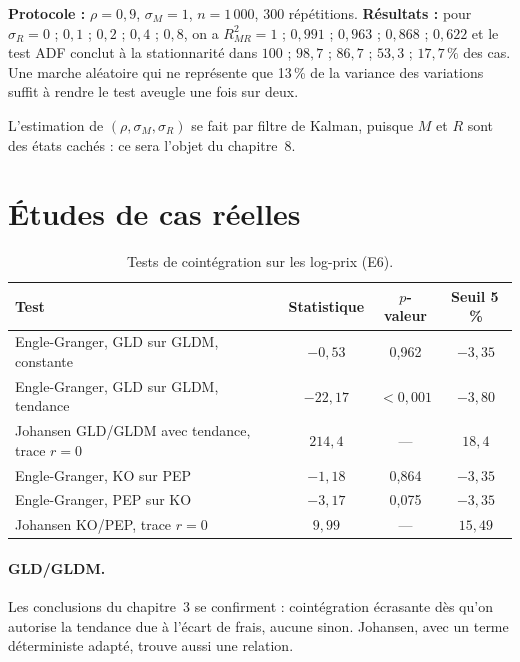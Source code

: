 \begin{codebox}
\textbf{Protocole :} $\rho = 0{,}9$, $\sigma_M = 1$, $n = 1\,000$, 300 répétitions. \textbf{Résultats :} pour $\sigma_R = 0$ ; $0{,}1$ ; $0{,}2$ ; $0{,}4$ ; $0{,}8$, on a $R^2_{MR} = 1$ ; $0{,}991$ ; $0{,}963$ ; $0{,}868$ ; $0{,}622$ et le test ADF conclut à la stationnarité dans $100$ ; $98{,}7$ ; $86{,}7$ ; $53{,}3$ ; $17{,}7\,\%$ des cas. Une marche aléatoire qui ne représente que 13\,\% de la variance des variations suffit à rendre le test aveugle une fois sur deux.
\end{codebox}

L'estimation de $(\rho,\sigma_M,\sigma_R)$ se fait par filtre de Kalman, puisque $M$ et $R$ sont des états cachés : ce sera l'objet du chapitre~8.

\section{Études de cas réelles}

\begin{table}[h]
\centering\small
\caption{Tests de cointégration sur les log-prix (E6).}
\label{c4:tab:real}
\begin{tabular}{lccc}
\toprule
Test & Statistique & $p$-valeur & Seuil 5\,\% \\
\midrule
Engle-Granger, GLD sur GLDM, constante & $-0{,}53$ & 0,962 & $-3{,}35$ \\
Engle-Granger, GLD sur GLDM, tendance & $-22{,}17$ & $<0{,}001$ & $-3{,}80$ \\
Johansen GLD/GLDM avec tendance, trace $r=0$ & $214{,}4$ & — & $18{,}4$ \\
Engle-Granger, KO sur PEP & $-1{,}18$ & 0,864 & $-3{,}35$ \\
Engle-Granger, PEP sur KO & $-3{,}17$ & 0,075 & $-3{,}35$ \\
Johansen KO/PEP, trace $r=0$ & $9{,}99$ & — & $15{,}49$ \\
\bottomrule
\end{tabular}
\end{table}

\paragraph{GLD/GLDM.} Les conclusions du chapitre~3 se confirment : cointégration écrasante dès qu'on autorise la tendance due à l'écart de frais, aucune sinon. Johansen, avec un terme déterministe adapté, trouve aussi une relation.


